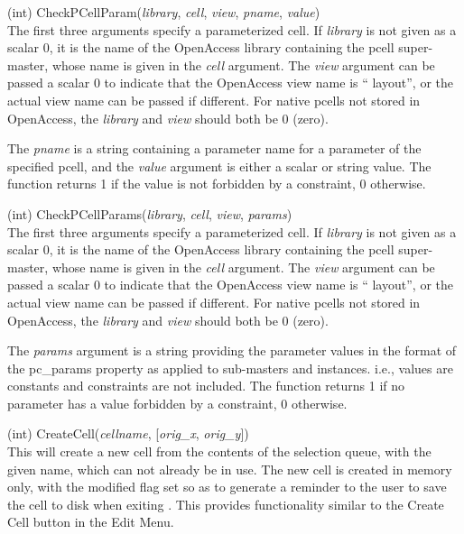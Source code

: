 \begin{description}
\item{(int) \vt CheckPCellParam({\it library\/}, {\it cell\/},
{\it view\/}, {\it pname\/}, {\it value\/})}\\
The first three arguments specify a parameterized cell.
If {\it library} is not given as a scalar 0, it is the name of the
OpenAccess library containing the pcell super-master, whose name is
given in the {\it cell} argument.  The {\it view} argument can be
passed a scalar 0 to indicate that the OpenAccess view name is ``{\vt
layout}'', or the actual view name can be passed if different.  For
{\Xic} native pcells not stored in OpenAccess, the {\it library} and
{\it view} should both be 0 (zero).

The {\it pname} is a string containing a parameter name for a
parameter of the specified pcell, and the {\it value} argument is
either a scalar or string value.  The function returns 1 if the value
is not forbidden by a constraint, 0 otherwise.

\item{(int) \vt CheckPCellParams({\it library\/}, {\it cell\/},
{\it view\/}, {\it params\/})}\\
The first three arguments specify a parameterized cell.
If {\it library} is not given as a scalar 0, it is the name of the
OpenAccess library containing the pcell super-master, whose name is
given in the {\it cell} argument.  The {\it view} argument can be
passed a scalar 0 to indicate that the OpenAccess view name is ``{\vt
layout}'', or the actual view name can be passed if different.  For
{\Xic} native pcells not stored in OpenAccess, the {\it library} and
{\it view} should both be 0 (zero).

The {\it params} argument is a string providing the parameter values
in the format of the {\et pc\_params} property as applied to
sub-masters and instances.  i.e., values are constants and constraints
are not included.  The function returns 1 if no parameter has a value
forbidden by a constraint, 0 otherwise.

\item{(int) \vt CreateCell({\it cellname\/}, [{\it orig\_x\/},
  {\it orig\_y\/}])}\\
This will create a new cell from the contents of the selection
queue, with the given name, which can not already be in use.  The new
cell is created in memory only, with the modified flag set so as to
generate a reminder to the user to save the cell to disk when exiting
{\Xic}.  This provides functionality similar to the {\cb Create Cell}
button in the {\cb Edit Menu}.


\end{description}
